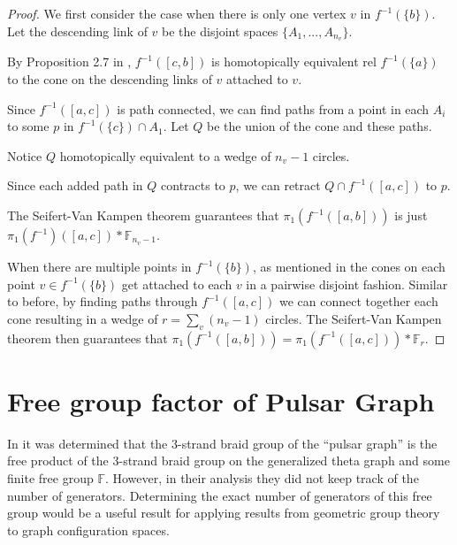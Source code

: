 \begin{proof}
We first consider the case when there is only one vertex \(v\) in \(f^{-1}(\{b\})\).
Let the descending link of \(v\) be the disjoint spaces \(\{A_1, ..., A_{n_v}\}\). 

By Proposition 2.7 in \cite{Bestvina2008PL}, \(f^{-1}([c,b])\) is homotopically equivalent
rel \(f^{-1}(\{a\})\) to the cone on the descending links of \(v\) attached to \(v\). 

Since \(f^{-1}([a,c])\) is path connected, 
we can find paths from a point in each \(A_i\) to some \(p\) in \(f^{-1}(\{c\}) \cap A_1\).
Let \(Q\) be the union of the cone and these paths.

Notice \(Q\) homotopically equivalent to a wedge of \(n_v - 1\) circles.

Since each added path in \(Q\) contracts to \(p\), we can retract \(Q \cap f^{-1}([a,c])\) to \(p\).

The Seifert-Van Kampen theorem guarantees that \(\pi_1(f^{-1}([a,b]))\) is just \(\pi_1(f^{-1})([a,c]) * \mathbb{F}_{n_v - 1}\).

When there are multiple points in \(f^{-1}(\{b\})\), as mentioned in \cite{Bestvina2008PL}
the cones on each point \(v \in f^{-1}(\{b\})\) get attached to each \(v\) in a pairwise disjoint fashion.
Similar to before, by finding paths through \(f^{-1}([a,c])\) we can connect together each cone
resulting in a wedge of \(r = \sum_{v} (n_v - 1)\) circles.
The Seifert-Van Kampen theorem then guarantees that
\(\pi_1(f^{-1}([a,b])) = \pi_1(f^{-1}([a,c])) * \mathbb{F}_r\).

\end{proof}

\section{Free group factor of Pulsar Graph}

In \cite{appiah2024algebraicstructurehyperbolicgraph} it was determined that the 3-strand braid group of the ``pulsar graph''
is the free product of the 3-strand braid group on the generalized theta graph and some finite free group \(\mathbb{F}\).
However, in their analysis they did not keep track of the number of generators.
Determining the exact number of generators of this free group would be a useful result for applying
results from geometric group theory to graph configuration spaces.

